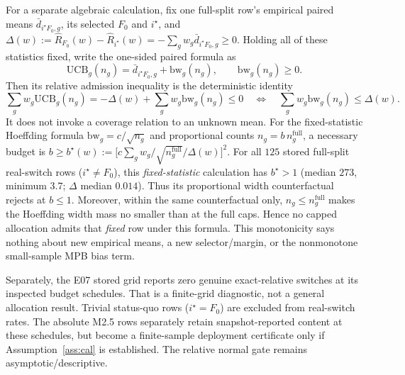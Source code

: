 \documentclass{article}
\begin{document}
For a separate algebraic calculation, fix one full-split row's empirical paired means
$\bar d_{i^\star F_0,g}$, its selected $F_0$ and $i^\star$, and
$\Delta(w):=\hat R_{F_0}(w)-\hat R_{i^\star}(w)
=-\sum_gw_g\bar d_{i^\star F_0,g}\ge0$. Holding all of these statistics fixed, write the
one-sided paired formula as
\[
 \mathrm{UCB}_g(n_g)=\bar d_{i^\star F_0,g}+\mathrm{bw}_g(n_g),
 \qquad \mathrm{bw}_g(n_g)\ge0 .
\]
Then its relative admission inequality is the deterministic identity
\[
 \sum_gw_g\mathrm{UCB}_g(n_g)=-\Delta(w)+
 \sum_gw_g\mathrm{bw}_g(n_g)\le0
 \quad\Longleftrightarrow\quad
 \sum_gw_g\mathrm{bw}_g(n_g)\le\Delta(w).
\]
It does not invoke a coverage relation to an unknown mean.
For the fixed-statistic Hoeffding formula
$\mathrm{bw}_g=c/\sqrt{n_g}$ and proportional counts
$n_g=b\,n_g^{\mathrm{full}}$, a necessary budget is
$b\ge b^\star(w):=\big[c\sum_gw_g/\sqrt{n_g^{\mathrm{full}}}/\Delta(w)\big]^2$.
For all $125$ stored full-split real-switch rows ($i^\star\ne F_0$), this
\emph{fixed-statistic} calculation has $b^\star>1$ (median $273$, minimum $3.7$;
$\Delta$ median $0.014$). Thus its proportional width counterfactual rejects at $b\le1$.
Moreover, within the same counterfactual only, $n_g\le n_g^{\mathrm{full}}$ makes the
Hoeffding width mass no smaller than at the full caps. Hence no capped allocation admits that
\emph{fixed} row under this formula. This monotonicity says nothing about new empirical means,
a new selector/margin, or the nonmonotone small-sample MPB bias term.

Separately, the E07 stored grid reports zero genuine exact-relative switches at its inspected
budget schedules. That is a finite-grid diagnostic, not a general allocation result. Trivial
status-quo rows ($i^\star{=}F_0$) are excluded from real-switch rates. The absolute M2.5
rows separately retain snapshot-reported content at these schedules, but become a
finite-sample deployment certificate only if Assumption~\ref{ass:cal} is established. The
relative normal gate remains asymptotic/descriptive.
\end{document}

